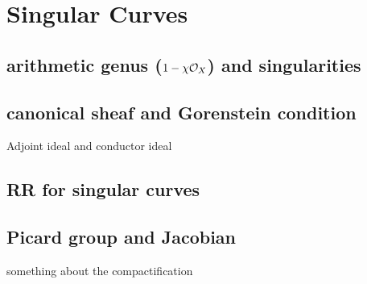 

\chapter{Singular Curves}
\label{SingularCurvesChapter}


\section{arithmetic genus ($1-\chi\cO_{X}$) and singularities}

\section{canonical sheaf and Gorenstein condition}
Adjoint ideal and conductor ideal

\section{RR for singular curves}

\section{Picard group and Jacobian}
\begin{fact}
 something about the compactification
\end{fact}

